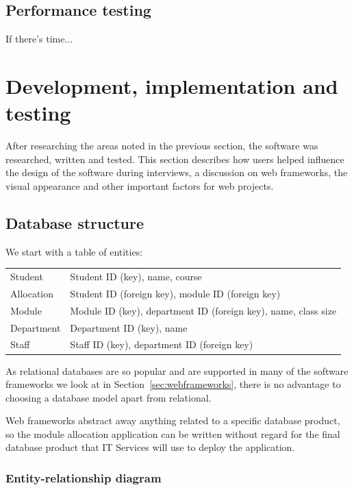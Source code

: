 \documentclass[]{scrartcl}
\begin{document}
\subsection{Performance testing}

If there's time...

\section{Development, implementation and testing}
\label{sec:implementation}


After researching the areas noted in the previous section, the software was
researched, written and tested. This section describes how users helped
influence the design of the software during interviews, a discussion on web
frameworks, the visual appearance and other important factors for web
projects.

\subsection{Database structure}

We start with a table of entities:

\begin{tabular}{ l l }
  Student    & Student ID (key), name, course \\
  Allocation & Student ID (foreign key), module ID (foreign key) \\
  Module     & Module ID (key), department ID (foreign key), name, class size \\
  Department & Department ID (key), name \\
  Staff      & Staff ID (key), department ID (foreign key) \\
\end{tabular}

As relational databases are so popular and are supported in many of the
software frameworks we look at in Section~\ref{sec:webframeworks}, there is no
advantage to choosing a database model apart from relational.

Web frameworks abstract away anything related to a specific database product,
so the module allocation application can be written without regard for the
final database product that IT Services will use to deploy the application.

\subsubsection{Entity-relationship diagram}
\end{document}
